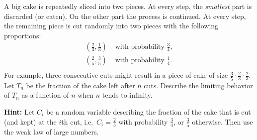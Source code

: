 \documentclass[a4paper,10pt,landscape,twocolumn]{scrartcl}
\begin{document}
\pagebreak

\begin{exercise}
A big cake is repeatedly sliced into two pieces. At every step, the \emph{smallest} part is discarded (or eaten). On the other part the process is continued. At every step, the remaining piece is cut randomly into two pieces with the following proportions:
\begin{align*}
\left(\frac{2}{3},\frac{1}{3}\right) &\mbox{ with probability } \frac{3}{4},\\
\left(\frac{2}{5},\frac{3}{5}\right) &\mbox{ with probability } \frac{1}{4}.\\
\end{align*}
For example, three consecutive cuts might result in a piece of cake of size $\frac{3}{5} \cdot \frac{2}{3} \cdot \frac{2}{3}$. Let $T_n$ be the fraction of the cake left after $n$ cuts. Describe the limiting behavior of $T_n$ as a function of $n$ when $n$ tends to infinity.

\textbf{Hint:} Let $C_i$ be a random variable describing the fraction of the cake that is cut (and kept) at the $i$th cut, i.e.\ $C_i = \frac{2}{3}$ with probability $\frac{3}{4}$, or $\frac{3}{5}$ otherwise.  Then use the weak law of large numbers.





\end{exercise}
\end{document}
